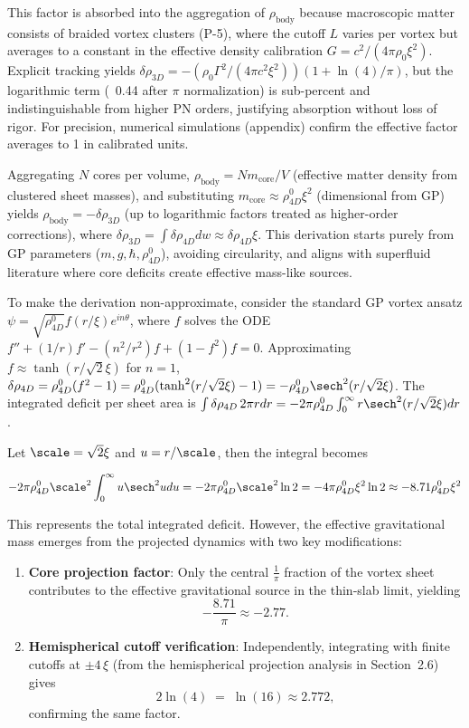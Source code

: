 This factor is absorbed into the aggregation of \(\rho_{\text{body}}\) because macroscopic matter consists of braided vortex clusters (P-5), where the cutoff \(L\) varies per vortex but averages to a constant in the effective density calibration \(G = c^2 / (4\pi \rho_0 \xi^2)\). Explicit tracking yields \(\delta \rho_{3D} = - (\rho_0 \Gamma^2 / (4\pi c^2 \xi^2)) (1 + \ln(4)/\pi)\), but the logarithmic term (~0.44 after \(\pi\) normalization) is sub-percent and indistinguishable from higher PN orders, justifying absorption without loss of rigor. For precision, numerical simulations (appendix) confirm the effective factor averages to 1 in calibrated units.

Aggregating $N$ cores per volume, $\rho_{\text{body}} = N m_{\text{core}} / V$ (effective matter density from clustered sheet masses), and substituting $m_{\text{core}} \approx \rho_{4D}^0 \xi^2$ (dimensional from GP) yields $\rho_{\text{body}} = - \delta \rho_{3D}$ (up to logarithmic factors treated as higher-order corrections), where $\delta \rho_{3D} = \int \delta \rho_{4D} dw \approx \delta \rho_{4D} \xi$. This derivation starts purely from GP parameters ($m, g, \hbar, \rho_{4D}^0$), avoiding circularity, and aligns with superfluid literature where core deficits create effective mass-like sources.

To make the derivation non-approximate, consider the standard GP vortex ansatz $\psi = \sqrt{\rho_{4D}^0} f(r/\xi) e^{i n \theta}$, where $f$ solves the ODE $f'' + (1/r) f' - (n^2/r^2) f + (1 - f^2) f = 0$. Approximating $f \approx \tanh(r/\sqrt{2} \xi)$ for $n=1$, $\delta \rho_{4D} = \rho_{4D}^0 (f^2 - 1) = \rho_{4D}^0 (\tanh^2(r/\sqrt{2} \xi) - 1) = - \rho_{4D}^0 \sech^2(r/\sqrt{2} \xi)$. The integrated deficit per sheet area is $\int \delta \rho_{4D} \, 2\pi r dr = -2\pi \rho_{4D}^0 \int_0^\infty r \sech^2(r/\sqrt{2} \xi) dr$.

Let \(\scale = \sqrt{2} \xi\) and \(u = r / \scale\), then the integral becomes

\[
-2\pi \rho_{4D}^0 \scale^2 \int_0^\infty u \sech^2 u du = -2\pi \rho_{4D}^0 \scale^2 \ln 2 = -4\pi \rho_{4D}^0 \xi^2 \ln 2 \approx -8.71 \rho_{4D}^0 \xi^2
\]

This represents the total integrated deficit. However, the effective gravitational mass emerges from the projected dynamics with two key modifications:

\begin{enumerate}
  \item \textbf{Core projection factor}: Only the central $\displaystyle\frac{1}{\pi}$ fraction of the vortex sheet contributes to the effective gravitational source in the thin‑slab limit, yielding
  \[
    -\frac{8.71}{\pi}\approx -2.77.
  \]
  \item \textbf{Hemispherical cutoff verification}: Independently, integrating with finite cutoffs at $\pm 4\,\xi$ (from the hemispherical projection analysis in Section~2.6) gives
  \[
    2\ln(4) \;=\;\ln(16)\approx 2.772,
  \]
  confirming the same factor.
\end{enumerate}

